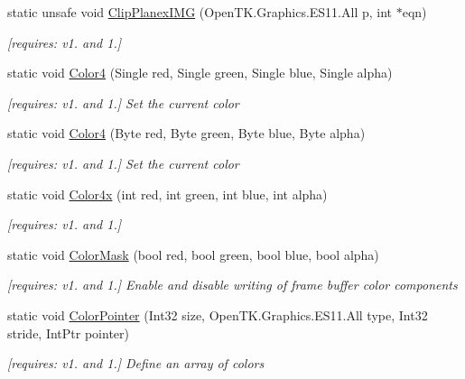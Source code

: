 \begin{DoxyCompactItemize}
static unsafe void \hyperlink{class_open_t_k_1_1_graphics_1_1_e_s11_1_1_g_l_a562f810bf94fe8c3d88ea4115e48e869}{Clip\-Planex\-I\-M\-G} (Open\-T\-K.\-Graphics.\-E\-S11.\-All p, int $\ast$eqn)
\begin{DoxyCompactList}\small\item\em \mbox{[}requires\-: v1. and 1.\mbox{]}\end{DoxyCompactList}\item 
static void \hyperlink{class_open_t_k_1_1_graphics_1_1_e_s11_1_1_g_l_ace17710463bb6b0ce243a62be8203e04}{Color4} (Single red, Single green, Single blue, Single alpha)
\begin{DoxyCompactList}\small\item\em \mbox{[}requires\-: v1. and 1.\mbox{]} Set the current color \end{DoxyCompactList}\item 
static void \hyperlink{class_open_t_k_1_1_graphics_1_1_e_s11_1_1_g_l_a70b5d57aeb8e3d4f31a0d6fca99e4689}{Color4} (Byte red, Byte green, Byte blue, Byte alpha)
\begin{DoxyCompactList}\small\item\em \mbox{[}requires\-: v1. and 1.\mbox{]} Set the current color \end{DoxyCompactList}\item 
static void \hyperlink{class_open_t_k_1_1_graphics_1_1_e_s11_1_1_g_l_a528393a7a30f210795aa9d2b72b1afc8}{Color4x} (int red, int green, int blue, int alpha)
\begin{DoxyCompactList}\small\item\em \mbox{[}requires\-: v1. and 1.\mbox{]}\end{DoxyCompactList}\item 
static void \hyperlink{class_open_t_k_1_1_graphics_1_1_e_s11_1_1_g_l_a01c90ac1b11a5d9ab99c0178e6ac7680}{Color\-Mask} (bool red, bool green, bool blue, bool alpha)
\begin{DoxyCompactList}\small\item\em \mbox{[}requires\-: v1. and 1.\mbox{]} Enable and disable writing of frame buffer color components \end{DoxyCompactList}\item 
static void \hyperlink{class_open_t_k_1_1_graphics_1_1_e_s11_1_1_g_l_a079f04be4365d8ff843ecdbf32fdcf32}{Color\-Pointer} (Int32 size, Open\-T\-K.\-Graphics.\-E\-S11.\-All type, Int32 stride, Int\-Ptr pointer)
\begin{DoxyCompactList}\small\item\em \mbox{[}requires\-: v1. and 1.\mbox{]} Define an array of colors \end{DoxyCompactList}\item 

\end{DoxyCompactItemize}
